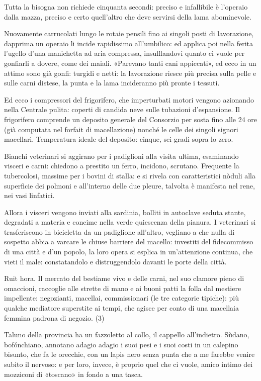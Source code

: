 Tutta la bisogna non richiede cinquanta secondi: preciso e infallibile è l’operaio dalla mazza, preciso e certo quell’altro che deve servirsi della lama abominevole.

Nuovamente carrucolati lungo le rotaie pensili fino ai singoli posti di lavorazione, dapprima un operaio li incide rapidissimo all’umbilico: ed applica poi nella ferita l’ugello d’una manichetta ad aria compressa, insufflandovi quanto ci vuole per gonfiarli a dovere, come dei maiali. «Parevano tanti cani appiccati», ed ecco in un attimo sono già gonfi: turgidi e netti: la lavorazione riesce più precisa sulla pelle e sulle carni distese, la punta e la lama incideranno più pronte i tessuti.

Ed ecco i compressori del frigorifero, che imperturbati motori vengono azionando nella Centrale pulita: coperti di candida neve sulle tubazioni d’espansione. Il frigorifero comprende un deposito generale del Consorzio per sosta fino alle 24 ore (già computata nel forfait di macellazione) nonché le celle dei singoli signori macellari. Temperatura ideale del deposito: cinque, sei gradi sopra lo zero.

Bianchi veterinari si aggirano per i padiglioni alla visita ultima, esaminando visceri e carni: chiedono a prestito un ferro, incidono, scrutano. Frequente la tubercolosi, massime per i bovini di stalla: e si rivela con caratteristici nòduli alla superficie dei polmoni e all’interno delle due pleure, talvolta è manifesta nel rene, nei vasi linfatici.

Allora i visceri vengono inviati alla sardinia, bolliti in autoclave seduta stante, degradati a materia e concime nella verde quiescenza della pianura. I veterinari si trasferiscono in bicicletta da un padiglione all’altro, vegliano a che nulla di sospetto abbia a varcare le chiuse barriere del macello: investiti del fidecommisso di una città e d’un popolo, la loro opera si esplica in un’attenzione continua, che vieti il male: constatandolo e distruggendolo davanti le porte della città.

Ruit hora. Il mercato del bestiame vivo e delle carni, nel suo clamore pieno di omaccioni, raccoglie alle strette di mano e ai buoni patti la folla dal mestiere impellente: negozianti, macellai, commissionari (le tre categorie tipiche): più qualche mediatore superstite ai tempi, che agisce per conto di una macellaia femmina padrona di negozio. (3)

Taluno della provincia ha un fazzoletto al collo, il cappello all’indietro. Sùdano, bofónchiano, annotano adagio adagio i suoi pesi e i suoi costi in un calepino bisunto, che fa le orecchie, con un lapis nero senza punta che a me farebbe venire subito il nervoso: e per loro, invece, è proprio quel che ci vuole, amico intimo dei mozziconi di «toscano» in fondo a una tasca.

